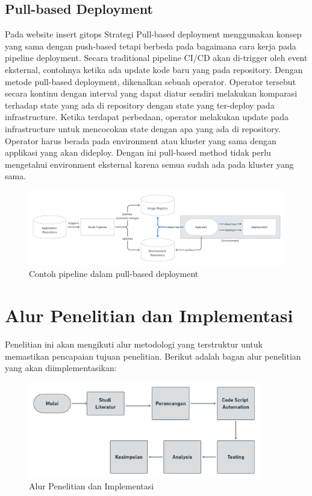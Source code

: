 \subsection{Pull-based Deployment}
Pada website insert gitops Strategi Pull-based deployment menggunakan konsep
yang sama dengan push-based tetapi berbeda pada bagaimana cara kerja pada pipeline deployment.
Secara traditional pipeline CI/CD akan di-trigger oleh event eksternal, contohnya ketika ada update kode
baru yang pada repository. Dengan metode pull-based deployment, dikenalkan sebuah operator.
Operator tersebut secara kontinu dengan interval yang dapat diatur sendiri melakukan komparasi
terhadap state yang ada di repository dengan state yang ter-deploy pada infrastructure.
Ketika terdapat perbedaan, operator melakukan update pada infrastructure untuk mencocokan state dengan apa yang ada di repository.
Operator harus berada pada environment atau kluster yang sama dengan applikasi yang akan dideploy. Dengan ini pull-based method
tidak perlu mengetahui environment eksternal karena semua sudah ada pada kluster yang sama.
\begin{figure}[h]
    \centering
    \includegraphics[width=1\textwidth]{figures/pull-based.png}
    \caption{Contoh pipeline dalam pull-based deployment}
\end{figure}
\vspace{0.5cm}

\newpage
\section{Alur Penelitian dan Implementasi}
Penelitian ini akan mengikuti alur metodologi yang terstruktur untuk memastikan pencapaian tujuan penelitian. Berikut adalah bagan alur penelitian yang akan diimplementasikan:

\begin{figure}[h]
    \centering
    \includegraphics[width=0.9\textwidth]{figures/Tahapan Skripsi.png}
    \caption{Alur Penelitian dan Implementasi}
    \label{fig:alur_penelitian}
\end{figure}

